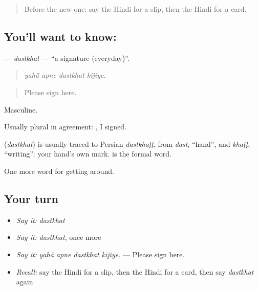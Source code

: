 \begin{quote}
Before the new one: say the Hindi for a slip, then the Hindi for a card.
\end{quote}

\subsection*{You'll want to know: }
\textbf{} — \emph{dastkhat} — \textquotedblleft{}a signature (everyday)\textquotedblright{}.

\begin{quote}
   
\end{quote}

\begin{quote}
\emph{yahā̃ apne dastkhat kījiye.}
\end{quote}

\begin{quote}
Please sign here.
\end{quote}

Masculine.

Usually plural in agreement:   , I signed.

\begin{cousinweb}
\textbf{} (\emph{dastkhat}) is usually traced to Persian \emph{dastkhaṭṭ}, from \emph{dast}, \textquotedblleft{}hand\textquotedblright{}, and \emph{khaṭṭ}, \textquotedblleft{}writing\textquotedblright{}: your hand's own mark.  is the formal word.
\end{cousinweb}

\begin{grammarlens}[title={What you've built}]
One more word for getting around.
\end{grammarlens}

\subsection*{Your turn}
\begin{itemize}
\raggedright
  \item \emph{Say it:} \emph{dastkhat}
  \item \emph{Say it:} \emph{dastkhat}, once more
  \item \emph{Say it:} \emph{yahā̃ apne dastkhat kījiye.} — Please sign here.
  \item \emph{Recall:} say the Hindi for a slip, then the Hindi for a card, then say \emph{dastkhat} again
\end{itemize}

